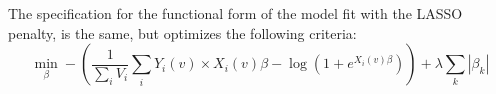 \documentclass{elsarticle_nonatbib}\usepackage[]{graphicx}\usepackage[]{color}
\begin{document}
The specification for the functional form of the model fit with the LASSO penalty, is the same, but optimizes the following criteria:
$$
\min_{\beta} - \left( \frac{1}{\sum_{i}V_i} \sum_i Y_{i}(v) \times X_i(v)\beta - \log \left(1 + e^{X_i(v)\beta}\right) \right) +\lambda\sum_{k}\left|\beta_k\right|
$$
\end{document}
